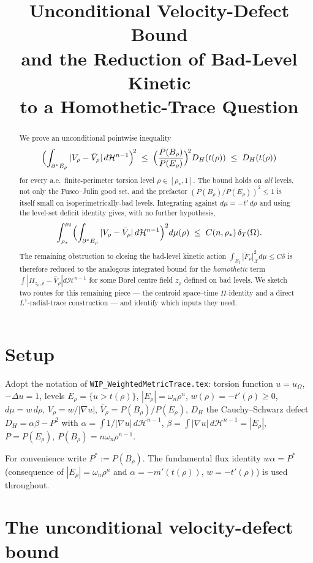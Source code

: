 \documentclass[11pt]{article}
\title{Unconditional Velocity-Defect Bound\\
       and the Reduction of Bad-Level Kinetic\\
       to a Homothetic-Trace Question}
\author{}
\date{}
\theoremstyle{definition}
\newcommand{\Om}{\Omega}
\newcommand{\rstar}{\rho_{*}}
\newcommand{\rdel}{\rho_\delta}
\newcommand{\Hn}{\mathcal H^{n-1}}
\newcommand{\X}{\mathcal X}
\begin{document}
\maketitle

\begin{abstract}
We prove an unconditional pointwise inequality
\[
   \Bigl(\int_{\partial^*E_\rho}|V_\rho-\bar V_\rho|\,d\Hn\Bigr)^{\!2}
   \;\le\;\Bigl(\frac{P(B_\rho)}{P(E_\rho)}\Bigr)^{\!2}D_H(t(\rho))
   \;\le\;D_H(t(\rho))
\]
for every a.e.\ finite-perimeter torsion level $\rho\in[\rstar,1]$.
The bound holds on \emph{all} levels, not only the Fusco--Julin good
set, and the prefactor $(P(B_\rho)/P(E_\rho))^{2}\le 1$ is itself
small on isoperimetrically-bad levels.  Integrating against
$d\mu=-t'\,d\rho$ and using the level-set deficit identity gives, with
no further hypothesis,
\[
   \int_{\rstar}^{\rdel}\Bigl(\int_{\partial^*E_\rho}|V_\rho-\bar V_\rho|\,d\Hn\Bigr)^{2}d\mu(\rho)
   \;\le\; C(n,\rstar)\,\delta_T(\Om).
\]
The remaining obstruction to closing the bad-level kinetic action
$\int_{B_I}|\dot F_\rho|_\X^{2}d\mu\le C\delta$ is therefore reduced
to the analogous integrated bound for the
\emph{homothetic} term $\int|H_{z_\rho,\rho}-\bar V_\rho|d\Hn$ for
some Borel centre field $z_\rho$ defined on bad levels.  We sketch
two routes for this remaining piece — the centroid space--time
$\Pi$-identity and a direct $L^1$-radial-trace
construction — and identify which inputs they need.
\end{abstract}

\section{Setup}\label{sec:setup}

Adopt the notation of \texttt{WIP\_WeightedMetricTrace.tex}: torsion
function $u=u_\Om$, $-\Delta u=1$, levels $E_\rho=\{u>t(\rho)\}$,
$|E_\rho|=\omega_n\rho^n$, $w(\rho)=-t'(\rho)\ge 0$,
$d\mu=w\,d\rho$, $V_\rho=w/|\nabla u|$,
$\bar V_\rho=P(B_\rho)/P(E_\rho)$, $D_H$ the Cauchy--Schwarz defect
$D_H=\alpha\beta-P^{2}$ with $\alpha=\int 1/|\nabla u|\,d\Hn$,
$\beta=\int|\nabla u|\,d\Hn=|E_\rho|$, $P=P(E_\rho)$,
$P(B_\rho)=n\omega_n\rho^{n-1}$.

For convenience write $P^{*}:=P(B_\rho)$.  The fundamental flux
identity $w\alpha=P^{*}$ (consequence of
$|E_\rho|=\omega_n\rho^n$ and $\alpha=-m'(t(\rho))$,
$w=-t'(\rho)$) is used throughout.

\section{The unconditional velocity-defect bound}\label{sec:main}
\end{document}
